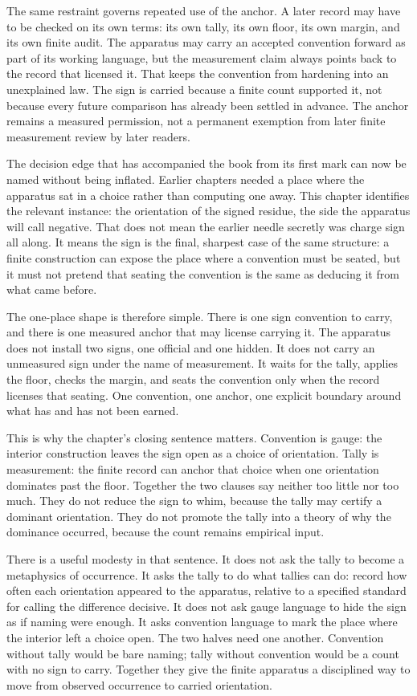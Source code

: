 The same restraint governs repeated use of the anchor. A later record may have
to be checked on its own terms: its own tally, its own floor, its own margin,
and its own finite audit.
The apparatus may carry an accepted convention forward as part of its working
language, but the measurement claim always points back to the record that
licensed it. That keeps the convention from hardening into an unexplained law.
The sign is carried because a finite count supported it, not because every
future comparison has already been settled in advance. The anchor remains a
measured permission, not a permanent exemption from later finite measurement
review by later readers.

The decision edge that has accompanied the book from its first mark can now be
named without being inflated. Earlier chapters needed a place where the
apparatus sat in a choice rather than computing one away. This chapter identifies
the relevant instance: the orientation of the signed residue, the side the
apparatus will call negative. That does not mean the earlier needle secretly was
charge sign all along. It means the sign is the final, sharpest case of the same
structure: a finite construction can expose the place where a convention must
be seated, but it must not pretend that seating the convention is the same as
deducing it from what came before.

The one-place shape is therefore simple. There is one sign convention to carry,
and there is one measured anchor that may license carrying it. The apparatus
does not install two signs, one official and one hidden. It does not carry an
unmeasured sign under the name of measurement. It waits for the tally, applies
the floor, checks the margin, and seats the convention only when the record
licenses that seating. One convention, one anchor, one explicit boundary around
what has and has not been earned.

This is why the chapter's closing sentence matters. Convention is gauge: the
interior construction leaves the sign open as a choice of orientation. Tally is
measurement: the finite record can anchor that choice when one orientation
dominates past the floor. Together the two clauses say neither too little nor
too much. They do not reduce the sign to whim, because the tally may certify a
dominant orientation. They do not promote the tally into a theory of why the
dominance occurred, because the count remains empirical input.

There is a useful modesty in that sentence. It does not ask the tally to become
a metaphysics of occurrence. It asks the tally to do what tallies can do:
record how often each orientation appeared to the apparatus, relative to a
specified standard for calling the difference decisive. It does not ask gauge
language to hide the sign as if naming were enough. It asks convention language
to mark the place where the interior left a choice open. The two halves need
one another. Convention without tally would be bare naming; tally without
convention would be a count with no sign to carry. Together they give the
finite apparatus a disciplined way to move from observed occurrence to carried
orientation.

